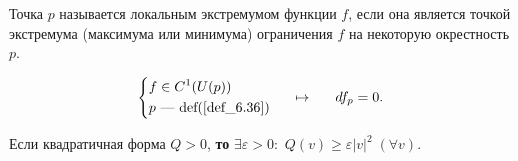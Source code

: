 \begin{to_def}
	Точка $p$ называется локальным экстремумом функции $f$, если она является точкой экстремума (максимума или минимума) ограничения $f$ на некоторую окрестность $p$.
	\label{def_6.36}
\end{to_def}

\begin{to_thr}
	\begin{equation*}
		\left\{\begin{aligned}
	    	&f \in C^1(U(p))\\
	    	&p \text{ --- def(\ref{def_6.36})}
		\end{aligned} \right.
		\hspace*{0.5 cm} \mapsto \hspace*{0.5 cm}
		\, d f_p = 0.
	\end{equation*}
	\label{thr_6.37}
\end{to_thr}

\begin{to_lem}
	Если квадратичная форма $Q > 0$, \textbf{то} $\exists \varepsilon>0 \colon $ $Q(v) \geq \varepsilon|v|^2 \;(\forall v)$.
	\label{lem_6.38}
\end{to_lem}
